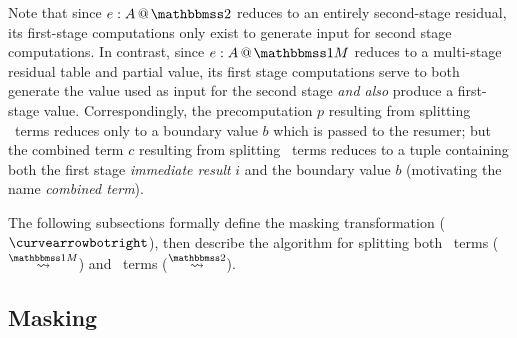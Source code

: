 \begin{abstrsyn}

Note that since $\coltwo e A$ reduces to an entirely second-stage
residual, its first-stage computations only exist to generate input
for second stage computations.  In contrast, since $\colmix e A$
reduces to a multi-stage residual table and partial value, its first
stage computations serve to both generate the value used as input for
the second stage {\em and also} produce a first-stage value.
Correspondingly, the precomputation $p$ resulting from splitting
\bbtwo\ terms reduces only to a boundary value $b$ which is passed to
the resumer; but the combined term $c$ resulting from splitting
\bbonem\ terms reduces to a tuple containing both the first stage {\em
  immediate result} $i$ and the boundary value $b$ (motivating the
name {\em combined term}).

The following subsections formally define the masking transformation
($\vsplito$), then describe the algorithm for splitting both
\bbonem\ terms ($\splitonesym$) and \bbtwo\ terms ($\splittwosym$).
  
\subsection{Masking}
\label{sec:masking}


\end{abstrsyn}
